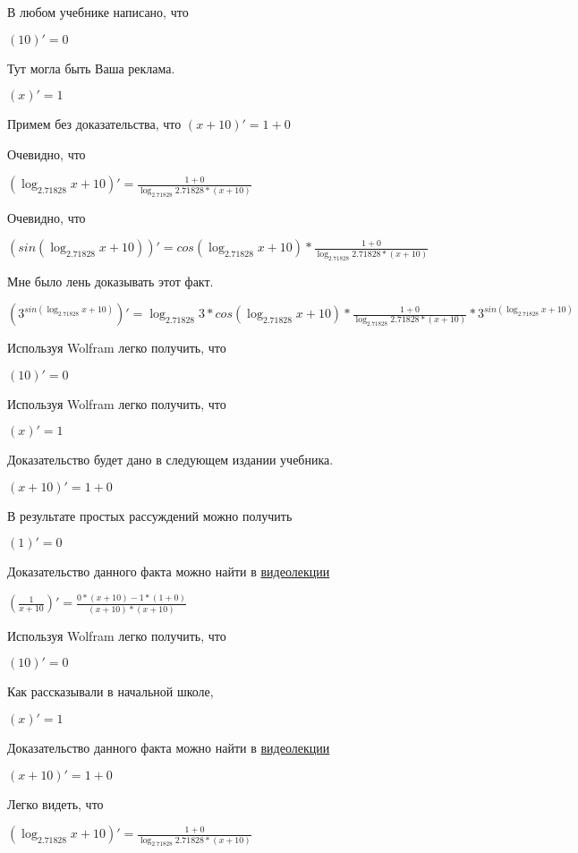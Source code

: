 \documentclass[12pt,a4paper,fleqn]{article}
\theoremstyle{definition}
\begin{document}
В любом учебнике написано, что

$( 10 )' =  0 $

Тут могла быть Ваша реклама.

$( x )' =  1 $

Примем без доказательства, что
$( x  +  10 )' =  1  +  0 $

Очевидно, что

$(\log_{ 2.71828 }{ x  +  10 })' = \frac{ 1  +  0 }{\log_{ 2.71828 }{ 2.71828 } * ( x  +  10 )}
$

Очевидно, что

$(sin(\log_{ 2.71828 }{ x  +  10 }))' = cos(\log_{ 2.71828 }{ x  +  10 }) * \frac{ 1  +  0 }{\log_{ 2.71828 }{ 2.71828 } * ( x  +  10 )}
$

Мне было лень доказывать этот факт.

$({ 3 }^{sin(\log_{ 2.71828 }{ x  +  10 })})' = \log_{ 2.71828 }{ 3 } * cos(\log_{ 2.71828 }{ x  +  10 }) * \frac{ 1  +  0 }{\log_{ 2.71828 }{ 2.71828 } * ( x  +  10 )}
 * { 3 }^{sin(\log_{ 2.71828 }{ x  +  10 })}$

Используя Wolfram легко получить, что

$( 10 )' =  0 $

Используя Wolfram легко получить, что

$( x )' =  1 $

Доказательство будет дано в следующем издании учебника.

$( x  +  10 )' =  1  +  0 $

В результате простых рассуждений можно получить

$( 1 )' =  0 $

Доказательство данного факта можно найти в \href{https://www.youtube.com/watch?v=dQw4w9WgXcQ}{видеолекции}

$(\frac{ 1 }{ x  +  10 }
)' = \frac{ 0  * ( x  +  10 ) -  1  * ( 1  +  0 )}{( x  +  10 ) * ( x  +  10 )}
$

Используя Wolfram легко получить, что

$( 10 )' =  0 $

Как рассказывали в начальной школе,

$( x )' =  1 $

Доказательство данного факта можно найти в \href{https://www.youtube.com/watch?v=dQw4w9WgXcQ}{видеолекции}

$( x  +  10 )' =  1  +  0 $

Легко видеть, что

$(\log_{ 2.71828 }{ x  +  10 })' = \frac{ 1  +  0 }{\log_{ 2.71828 }{ 2.71828 } * ( x  +  10 )}
$
\end{document}
